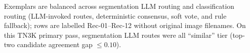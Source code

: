\par\smallskip\noindent\footnotesize Exemplars are balanced across segmentation LLM routing and classification routing (LLM-invoked routes, deterministic consensus, soft vote, and rule fallback); rows are labelled Rec-01--Rec-12 without original image filenames. On this TN3K primary pass, segmentation LLM routes were all ``similar'' tier (top-two candidate agreement gap $\leq 0.10$).
